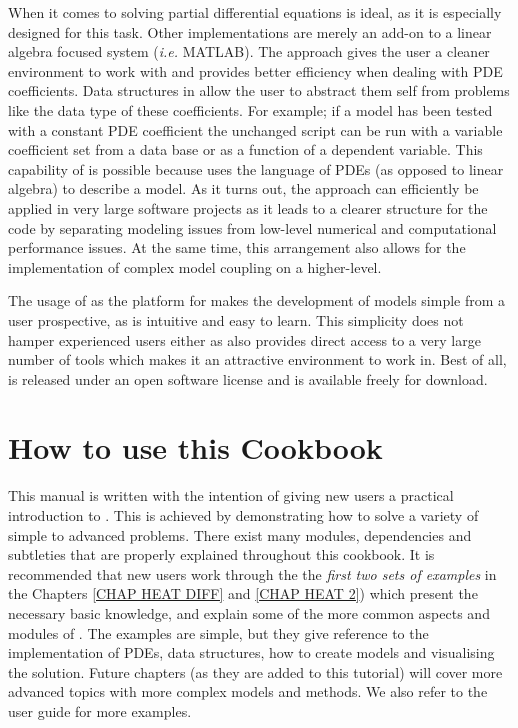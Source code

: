 When it comes to solving partial differential equations \esc is ideal, as it is especially designed for this task. Other implementations are merely an add-on to a linear algebra focused system (\textit{i.e.} MATLAB). The \esc approach gives the user a cleaner environment to work with and provides better efficiency when dealing with PDE coefficients. Data structures in \esc allow the user to abstract them self from problems like the data type of these coefficients. For example; if a model has been tested with a constant PDE coefficient the unchanged script can be run with a variable coefficient set from a data base or as a function of a dependent variable. This capability of \esc is possible because \esc uses the language of PDEs (as opposed to linear algebra) to describe a model. As it turns out, the \esc approach can efficiently be applied in very large software projects as it leads to a clearer structure for the code by separating modeling issues from low-level numerical and computational performance issues.  At the same time, this arrangement also allows for the implementation of complex model coupling on a higher-level. 

The usage of \pyt as the platform for \esc makes the development of models  simple from a user prospective, as \pyt is intuitive and easy to learn. This simplicity does not hamper experienced users either as \pyt also provides direct access to a very large number of tools which makes it an attractive environment to work in. Best of all, \esc is released under an open software license and is available freely for download.

\section{How to use this Cookbook}
This manual is written with the intention of giving new users a practical introduction to \esc. This is achieved by demonstrating how to solve a variety of simple to advanced problems. There exist many modules, dependencies and subtleties that are properly explained throughout this cookbook. It is recommended that new users work through the
the \textit{first two sets of examples} in the Chapters \ref{CHAP HEAT DIFF} and \ref{CHAP HEAT 2})
which present the necessary basic knowledge, and explain some of the more common aspects and modules of \esc. The examples are simple, but they give reference to the implementation of PDEs, data structures, how to create models and visualising the solution. 
Future chapters (as they are added to this tutorial) will cover more advanced topics with more complex models and methods. We also refer to the \esc user guide for more examples.

